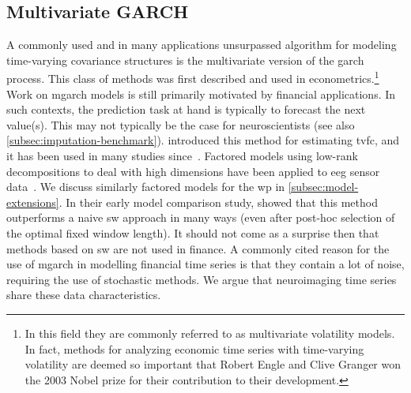 \subsection{Multivariate GARCH}

A commonly used and in many applications unsurpassed algorithm for modeling time-varying covariance structures is the multivariate version of the \gls{garch}~\parencite{Engle1982, Bollerslev1986} process.
This class of methods was first described and used in econometrics.\footnote{In this field they are commonly referred to as multivariate volatility models. In fact, methods for analyzing economic time series with time-varying volatility are deemed so important that Robert Engle and Clive Granger won the 2003 Nobel prize for their contribution to their development.}
Work on \gls{mgarch} models is still primarily motivated by financial applications.
In such contexts, the prediction task at hand is typically to forecast the next value(s).
This may not typically be the case for neuroscientists (see also \cref{subsec:imputation-benchmark}).
%
\textcite{Lindquist2014} introduced this method for estimating \gls{tvfc}, and it has been used in many studies since~\parencite[see e.g.][]{Choe2017, Preti2017, Foti2019, Hakimdavoodi2020}.
Factored models using low-rank decompositions to deal with high dimensions have been applied to \gls{eeg} sensor data~\parencite{Nakajima2017}.
We discuss similarly factored models for the \gls{wp} in \cref{subsec:model-extensions}.
%
In their early model comparison study, \textcite{Lindquist2014} showed that this method outperforms a naive \gls{sw} approach in many ways (even after post-hoc selection of the optimal fixed window length).
It should not come as a surprise then that methods based on \gls{sw} are not used in finance.
%
A commonly cited reason for the use of \gls{mgarch} in modelling financial time series is that they contain a lot of noise, requiring the use of stochastic methods.
We argue that neuroimaging time series share these data characteristics.

